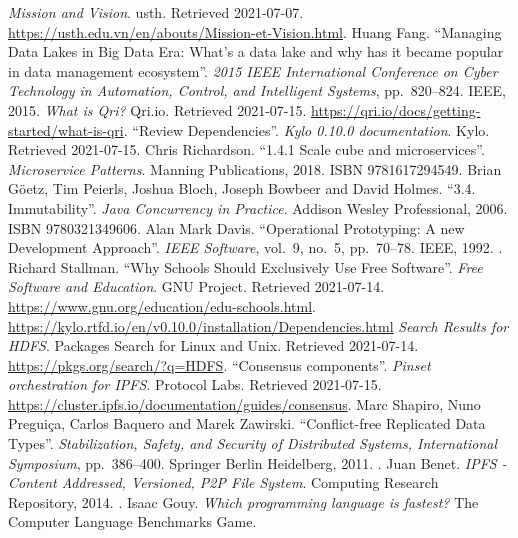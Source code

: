 \begin{thebibliography}{69}
   \emph{Mission and Vision}.
    \acrlong{usth}.  Retrieved 2021-07-07.
    \url{https://usth.edu.vn/en/abouts/Mission-et-Vision.html}.
   Huang Fang.
    ``Managing Data Lakes in Big Data Era: What's a data lake
    and why has it became popular in data management ecosystem''.
    \emph{2015 IEEE International Conference on Cyber Technology
    in Automation, Control, and Intelligent Systems}, pp.~820--824.
    IEEE, 2015.  
   \emph{What is Qri?} Qri.io.  Retrieved 2021-07-15.
    \url{https://qri.io/docs/getting-started/what-is-qri}.
   ``Review Dependencies''.  \emph{Kylo 0.10.0 documentation}.
    Kylo.  Retrieved 2021-07-15.
   Chris Richardson.
    ``1.4.1 Scale cube and microservices''.  \emph{Microservice Patterns}.
    Manning Publications, 2018.  ISBN 9781617294549.
   Brian Göetz, Tim Peierls, Joshua Bloch,
    Joseph Bowbeer and David Holmes.
    ``3.4. Immutability''.  \emph{Java Concurrency in Practice}.
    Addison Wesley Professional, 2006.  ISBN 9780321349606.
   Alan Mark Davis.
    ``Operational Prototyping: A new Development Approach''.
    \emph{IEEE Software}, vol.~9, no.~5, pp.~70--78.
    IEEE, 1992.  .
   Richard Stallman.
    ``Why Schools Should Exclusively Use Free Software''.
    \emph{Free Software and Education}.  GNU Project.  Retrieved 2021-07-14.
    \url{https://www.gnu.org/education/edu-schools.html}.
    \url{https://kylo.rtfd.io/en/v0.10.0/installation/Dependencies.html}
   \emph{Search Results for HDFS}.
    Packages Search for Linux and Unix.
    Retrieved 2021-07-14.  \url{https://pkgs.org/search/?q=HDFS}.
   ``Consensus components''.
    \emph{Pinset orchestration for IPFS}.
    Protocol Labs.  Retrieved 2021-07-15.
    \url{https://cluster.ipfs.io/documentation/guides/consensus}.
   Marc Shapiro, Nuno Preguiça, Carlos Baquero and Marek Zawirski.
    ``Conflict-free Replicated Data Types''.
    \emph{Stabilization, Safety, and Security of Distributed Systems,
     International Symposium}, pp.~386--400.
    Springer Berlin Heidelberg, 2011.  .
   Juan Benet.
    \emph{IPFS - Content Addressed, Versioned, P2P File System}.
    Computing Research Repository, 2014.  .
   Isaac Gouy.
    \emph{Which programming language is fastest?}
    The Computer Language Benchmarks Game.

\end{thebibliography}
